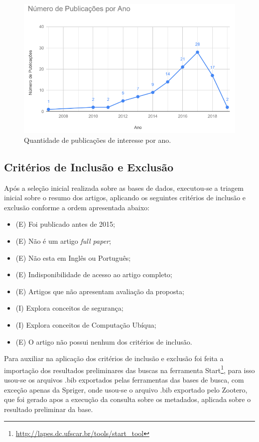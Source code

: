 \documentclass[tid,table]{texufpel} %
\begin{document}
\begin{figure}[ht]
	\centering
	\includegraphics[width=.9\textwidth]{imagens/grafPublicaAno.png}
	\caption{Quantidade de publicações de interesse por ano.}
	\label{fig:grafPublicaAno}
\end{figure}

\subsection{Critérios de Inclusão e Exclusão}
Após a seleção inicial realizada sobre as bases de dados, executou-se a triagem inicial sobre o resumo dos artigos, aplicando os seguintes critérios de inclusão e exclusão conforme a ordem apresentada abaixo: 
\begin{itemize}
	\item (E) Foi publicado antes de 2015;
	\item (E) Não é um artigo \textit{full paper};
	\item (E) Não esta em Inglês ou Português;
	\item (E) Indisponibilidade de acesso ao artigo completo;
	\item (E) Artigos que não apresentam avaliação da proposta;
	\item (I) Explora conceitos de segurança;
	\item (I) Explora conceitos de Computação Ubíqua;
	\item (E) O artigo não possui nenhum dos critérios de inclusão.
\end{itemize}
	
Para auxiliar na aplicação dos critérios de inclusão e exclusão foi feita a importação dos resultados preliminares das buscas na ferramenta Start\footnote{\url{http://lapes.dc.ufscar.br/tools/start_tool}},
para isso usou-se os arquivos .bib exportados pelas ferramentas das bases de busca, com exceção apenas da Spriger, onde usou-se o arquivo .bib exportado pelo Zootero, que foi gerado apos a execução da consulta sobre os metadados, aplicada sobre o resultado preliminar da base.
\end{document}
